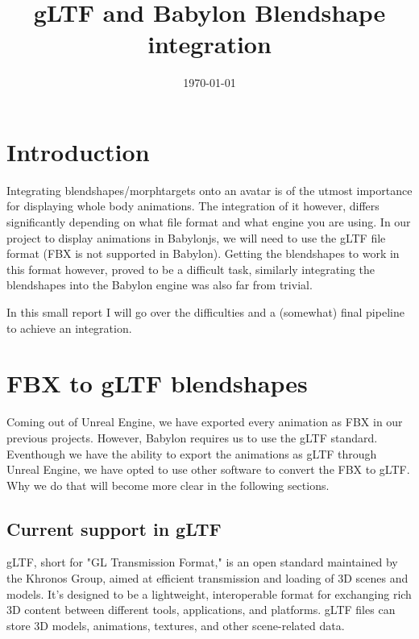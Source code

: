 \documentclass{uva-inf-article}
\title{gLTF and Babylon Blendshape integration}
\date{\today}
\begin{document}
\maketitle
\tableofcontents
\newpage


\section{Introduction}
Integrating blendshapes/morphtargets onto an avatar is of the utmost importance for displaying whole body animations. The integration of it however, differs significantly depending on what file format and what engine you are using. In our project to display animations in Babylonjs, we will need to use the gLTF file format (FBX is not supported in Babylon). Getting the blendshapes to work in this format however, proved to be a difficult task, similarly integrating the blendshapes into the Babylon engine was also far from trivial.

In this small report I will go over the difficulties and a (somewhat) final pipeline to achieve an integration.

\section{FBX to gLTF blendshapes}
Coming out of Unreal Engine, we have exported every animation as FBX in our previous projects. However, Babylon requires us to use the gLTF standard. Eventhough we have the ability to export the animations as gLTF through Unreal Engine, we have opted to use other software to convert the FBX to gLTF. Why we do that will become more clear in the following sections.

\subsection{Current support in gLTF}
gLTF, short for "GL Transmission Format," is an open standard maintained by the Khronos Group, aimed at efficient transmission and loading of 3D scenes and models. It's designed to be a lightweight, interoperable format for exchanging rich 3D content between different tools, applications, and platforms. gLTF files can store 3D models, animations, textures, and other scene-related data.
\end{document}
